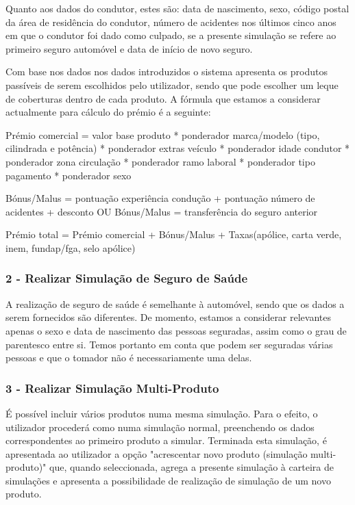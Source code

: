 Quanto aos dados do condutor, estes são: data de nascimento, sexo, código postal da área de residência do condutor, número de acidentes nos últimos cinco anos em que o condutor foi dado como culpado, se a presente simulação se refere ao primeiro seguro automóvel e data de início de novo seguro. 

Com base nos dados nos dados introduzidos o sistema apresenta os produtos passíveis de serem escolhidos pelo utilizador, sendo que pode escolher um leque de coberturas dentro de cada produto. A fórmula que estamos a considerar actualmente para cálculo do prémio é a seguinte:

Prémio comercial = valor base produto * ponderador marca/modelo (tipo, cilindrada e potência) * ponderador extras veículo * ponderador idade condutor * ponderador zona circulação * ponderador ramo laboral * ponderador tipo pagamento * ponderador sexo

Bónus/Malus = pontuação experiência condução + pontuação número de acidentes + desconto
OU
Bónus/Malus = transferência do seguro anterior

Prémio total = Prémio comercial + Bónus/Malus + Taxas(apólice, carta verde, inem, fundap/fga, selo apólice)

\subsubsection{\textbf{2 - Realizar Simulação de Seguro de Saúde}}
A realização de seguro de saúde é semelhante à automóvel, sendo que os dados a serem fornecidos são diferentes. De momento, estamos a considerar relevantes apenas o sexo e data de nascimento das pessoas seguradas, assim como o grau de parentesco entre si. Temos portanto em conta que podem ser seguradas várias pessoas e que o tomador não é necessariamente uma delas.

\subsubsection{\textbf{3 - Realizar Simulação Multi-Produto}}
É possível incluir vários produtos numa mesma simulação. Para o efeito, o utilizador procederá como numa simulação normal, preenchendo os dados correspondentes ao primeiro produto a simular. Terminada esta simulação, é apresentada ao utilizador a opção "acrescentar novo produto (simulação multi-produto)" que, quando seleccionada, agrega a presente simulação à carteira de simulações e apresenta a possibilidade de realização de simulação de um novo produto. 

